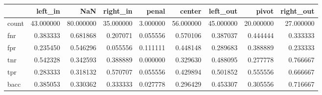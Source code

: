 \begin{tabular}{lrrrrrrrr}
\toprule
{} &    left\_in &        NaN &   right\_in &     penal &     center &   left\_out &      pivot &  right\_out \\
\midrule
count &  43.000000 &  80.000000 &  35.000000 &  3.000000 &  56.000000 &  45.000000 &  20.000000 &  27.000000 \\
fnr   &   0.383333 &   0.681868 &   0.207071 &  0.055556 &   0.570106 &   0.387037 &   0.444444 &   0.333333 \\
fpr   &   0.235450 &   0.546296 &   0.055556 &  0.111111 &   0.448148 &   0.289683 &   0.388889 &   0.233333 \\
tnr   &   0.542328 &   0.342593 &   0.388889 &  0.000000 &   0.329630 &   0.488095 &   0.277778 &   0.766667 \\
tpr   &   0.283333 &   0.318132 &   0.570707 &  0.055556 &   0.429894 &   0.501852 &   0.555556 &   0.666667 \\
bacc  &   0.385053 &   0.330362 &   0.333333 &  0.027778 &   0.296429 &   0.453307 &   0.305556 &   0.716667 \\
\bottomrule
\end{tabular}
